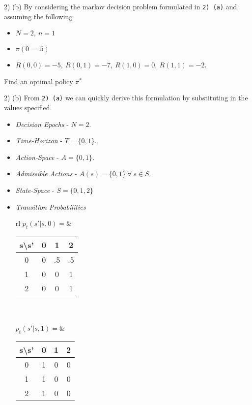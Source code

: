 \documentclass[11pt,a4paper]{article}
\begin{document}
\begin{question}{2) (b)}
  By considering the markov decision problem formulated in \texttt{2) (a)} and assuming the following
  \begin{itemize}
    \item $N=2,\ n=1$
    \item $\pi(0=.5)$
    \item $R(0,0)=-5,\ R(0,1)=-7,\ R(1,0)=0,\ R(1,1)=-2$.
  \end{itemize}
  Find an optimal policy $\pi^*$
\end{question}

\begin{answer}{2) (b)}
  From \texttt{2) (a)} we can quickly derive this formulation by substituting in the values specified.
  \begin{itemize}
    \item \textit{Decision Epochs} - $N=2$.

    \item \textit{Time-Horizon} - $T=\{0,1\}$.

    \item \textit{Action-Space} - $A=\{0,1\}$.

    \item \textit{Admissible Actions} - $A(s)=\{0,1\}\ \forall\ s\in S$.

    \item \textit{State-Space} - $S=\{0,1,2\}$

    \item \textit{Transition Probabilities}\\
    \begin{tabular}{rl}
      $p_t(s'|s,0)=$&\begin{tabular}{c|ccc}
        s\textbackslash s'&0&1&2\\\hline
        0&0&.5&.5\\
        1&0&0&1\\
        2&0&0&1
      \end{tabular}\\\\
      $p_t(s'|s,1)=$&\begin{tabular}{c|ccc}
        s\textbackslash s'&0&1&2\\\hline
        0&1&0&0\\
        1&1&0&0\\
        2&1&0&0
      \end{tabular}
    \end{tabular}


\end{itemize}
\end{answer}
\end{document}
